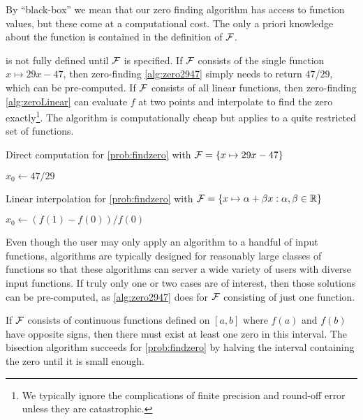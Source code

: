 By ``black-box'' we mean that our zero finding algorithm has access to function values, but these come at a computational cost. The only a priori knowledge about the function is contained in the definition of $\mathcal{F}$.

 is not fully defined until $\mathcal{F}$ is specified.  If $\mathcal{F}$ consists of the single function $x \mapsto 29x - 47$, then zero-finding \cref{alg:zero2947} simply needs to return $47/29$, which can be pre-computed.  If $\mathcal{F}$ consists of all linear functions, then zero-finding \cref{alg:zeroLinear} can evaluate $f$ at two points and interpolate to find the zero exactly\footnote{We typically ignore the complications of finite precision and round-off error unless they are catastrophic.}.  The algorithm is computationally cheap but applies to a quite restricted set of functions.  

\begin{algorithm}[H]
\caption{Direct computation for \cref{prob:findzero} with $\mathcal{F} = \{x \mapsto 29x - 47 \}$ \label{alg:zero2947}}
	\begin{algorithmic}
    \RETURN $x_0 \leftarrow 47/29$
    \end{algorithmic}
\end{algorithm}

\begin{algorithm}[H]
\caption{Linear interpolation for \cref{prob:findzero} with $\mathcal{F} = \{x \mapsto \alpha  + \beta x : \alpha, \beta \in \mathbb{R}\}$ \label{alg:zeroLinear}}
	\begin{algorithmic}
    \RETURN $x_0 \leftarrow (f(1) - f(0))/f(0)$
    \end{algorithmic}
\end{algorithm}

Even though the user may only apply an algorithm to a handful of input functions, algorithms are typically designed for reasonably large classes of functions so that these algorithms can server a wide variety of users with diverse input functions.  If truly only one or two cases are of interest, then those solutions can be pre-computed, as \cref{alg:zero2947} does for $\mathcal{F}$ consisting of just one function.

If $\mathcal{F}$ consists of continuous functions defined on $[a,b]$ where $f(a)$ and $f(b)$ have opposite signs, then there must exist at least one zero in this interval.  The bisection algorithm succeeds for \cref{prob:findzero} by halving the interval containing the zero until it is small enough.

